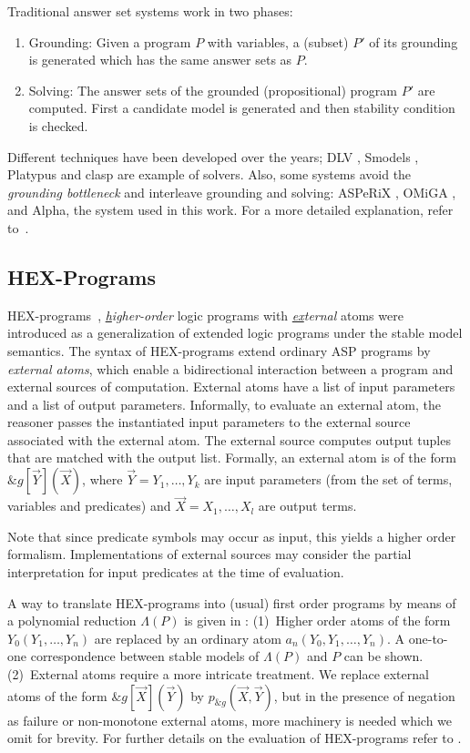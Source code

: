 Traditional answer set systems work in two phases:
\begin{enumerate}
\item Grounding: Given a program \(P\) with variables, a (subset) \(P'\) of its grounding is generated which has the same answer sets as \(P\).
\item Solving: The answer sets of the grounded (propositional) program \(P'\) are computed. First a candidate model is generated and then stability condition is checked.
\end{enumerate}

Different techniques have been developed over the years; DLV \cite{dlv}, Smodels \cite{smodels}, Platypus \cite{platypus} and clasp \cite{clasp} are example of solvers. Also, some systems avoid the \emph{grounding bottleneck} and interleave grounding and solving: ASPeRiX \cite{asperix,fofchain}, OMiGA \cite{omiga}, and Alpha, the system used in this work. For a more detailed explanation, refer to~\cite{primer,aspbook}.

\subsection{HEX-Programs}
HEX-programs~\cite{hex}, \emph{\underline{h}igher-order} logic programs with \emph{\underline{ex}ternal} atoms were introduced as a generalization of extended logic programs under the stable model semantics. The syntax of HEX-programs extend ordinary ASP programs by \emph{external atoms}, which enable a bidirectional interaction between a program and external sources of computation. External atoms have a list of input parameters and a list of output parameters. Informally, to evaluate an external atom, the reasoner passes the instantiated input parameters to the external source associated with the external atom. The external source computes output tuples that are matched with the output list. Formally, an external atom is of the form \(\&g[\vec{Y}](\vec{X})\), where \(\vec{Y} = Y_1, \dotso , Y_k\) are input parameters (from the set of terms, variables and predicates) and \(\vec{X} = X_1, \dotso , X_l \) are output terms.

Note that since predicate symbols may occur as input, this yields a higher order formalism. Implementations of external sources may consider the partial interpretation for input predicates at the time of evaluation.

A way to translate HEX-programs into (usual) first order programs by means of a polynomial reduction \(\Lambda(P)\) is given in \cite{hex}: (1)~Higher order atoms of the form \(Y_0(Y_1, \dotso, Y_n)\) are replaced by an ordinary atom \(a_n(Y_0, Y_1, \dotso, Y_n)\). A one-to-one correspondence between stable models of \(\Lambda(P)\) and \(P\) can be shown. (2)~External atoms require a more intricate treatment. We replace external atoms of the form \(\&g[\vec{X}](\vec{Y})\) by \(p_{\&g}(\vec{X},\vec{Y})\), but in the presence of negation as failure or non-monotone external atoms, more machinery is needed which we omit for brevity. For further details on the evaluation of HEX-programs refer to \cite{effeval1,effeval2}.